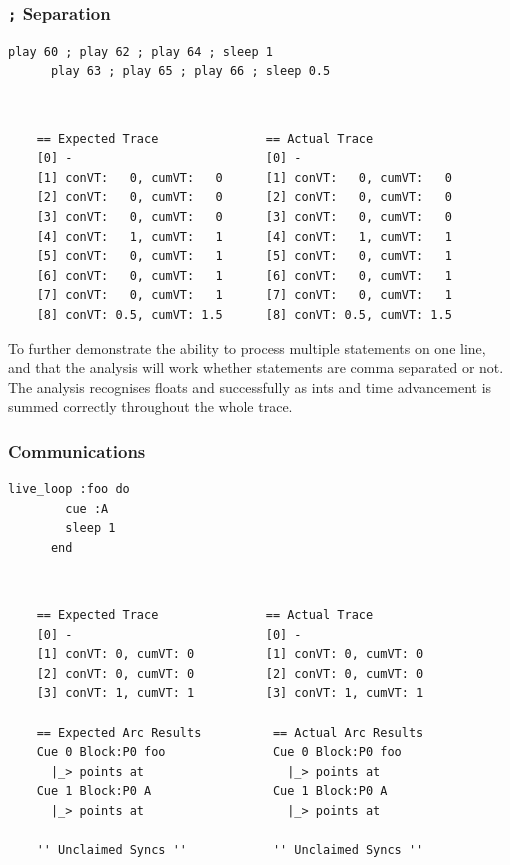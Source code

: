 \documentclass[11pt, abstracton, twoside, titlepage=true]{scrartcl}
\begin{document}
\subsubsection{\texttt{;} Separation}
\begin{minipage}{\textwidth}
	\begin{lstlisting}[style = sonicpi]
      play 60 ; play 62 ; play 64 ; sleep 1
      play 63 ; play 65 ; play 66 ; sleep 0.5
	\end{lstlisting}
\end{minipage}
\\
\begin{lstlisting}
    == Expected Trace               == Actual Trace
    [0] -                           [0] -
    [1] conVT:   0, cumVT:   0      [1] conVT:   0, cumVT:   0
    [2] conVT:   0, cumVT:   0      [2] conVT:   0, cumVT:   0
    [3] conVT:   0, cumVT:   0      [3] conVT:   0, cumVT:   0
    [4] conVT:   1, cumVT:   1      [4] conVT:   1, cumVT:   1
    [5] conVT:   0, cumVT:   1      [5] conVT:   0, cumVT:   1
    [6] conVT:   0, cumVT:   1      [6] conVT:   0, cumVT:   1
    [7] conVT:   0, cumVT:   1      [7] conVT:   0, cumVT:   1
    [8] conVT: 0.5, cumVT: 1.5      [8] conVT: 0.5, cumVT: 1.5
\end{lstlisting}

To further demonstrate the ability to process multiple statements on one line,
and that the analysis will work whether statements are comma separated or not. The
analysis recognises floats and successfully as ints and time advancement is summed
correctly throughout the whole trace.

\subsubsection{Communications}
\begin{minipage}{\textwidth}
	\begin{lstlisting}[style = sonicpi]
      live_loop :foo do
        cue :A
        sleep 1
      end
	\end{lstlisting}
\end{minipage}
\\
\begin{lstlisting}
    == Expected Trace               == Actual Trace
    [0] -                           [0] -
    [1] conVT: 0, cumVT: 0          [1] conVT: 0, cumVT: 0
    [2] conVT: 0, cumVT: 0          [2] conVT: 0, cumVT: 0
    [3] conVT: 1, cumVT: 1          [3] conVT: 1, cumVT: 1

    == Expected Arc Results          == Actual Arc Results 
    Cue 0 Block:P0 foo               Cue 0 Block:P0 foo
      |_> points at                    |_> points at 
    Cue 1 Block:P0 A                 Cue 1 Block:P0 A
      |_> points at                    |_> points at 
    
    '' Unclaimed Syncs ''            '' Unclaimed Syncs '' 
\end{lstlisting}
\end{document}
